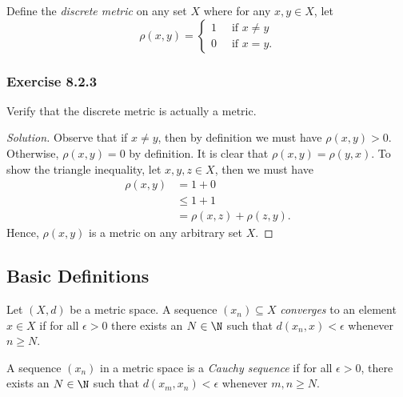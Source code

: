 Define the \textit{discrete metric} on any set \( X  \) where for any \( x, y \in X  \), let 
\[  \rho (x,y) = 
\begin{cases}
    1 \  &\text{ if } x \neq y \\
    0 \ &\text{ if } x = y.
\end{cases}  \]

\subsubsection{Exercise 8.2.3} Verify that the discrete metric is actually a metric.
\begin{proof}[Solution]
Observe that if \( x \neq y  \), then by definition we must have \( \rho(x,y) > 0  \). Otherwise, \( \rho(x,y) = 0  \) by definition. It is clear that \( \rho(x,y) = \rho(y,x) \). To show the triangle inequality, let \( x,y,z \in X  \), then we must have 
\begin{align*}
    \rho(x,y) &= 1 + 0   \\
              &\leq 1 + 1 \\
              &= \rho(x,z) + \rho(z,y). 
\end{align*}
Hence, \( \rho(x,y)  \) is a metric on any arbitrary set \(  X \).
\end{proof}

\subsection{Basic Definitions}

\begin{tcolorbox}
\begin{defn}
Let \( (X,d)  \) be a metric space. A sequence \( (x_{n}) \subseteq  X  \) \textit{converges} to an element \( x \in X  \) if for all \( \epsilon > 0  \) there exists an \( N \in \N  \) such that \( d(x_{n} ,x )  < \epsilon \) whenever \( n \geq N  \).
\end{defn}
\end{tcolorbox}


\begin{tcolorbox}
\begin{defn}
A sequence \( (x_{n}) \) in a metric space is a \textit{Cauchy sequence} if for all \( \epsilon > 0  \), there exists an \( N \in \N  \) such that \( d(x_{m}, x_{n}) < \epsilon \) whenever \( m, n \geq N  \).
\end{defn} 
\end{tcolorbox}


